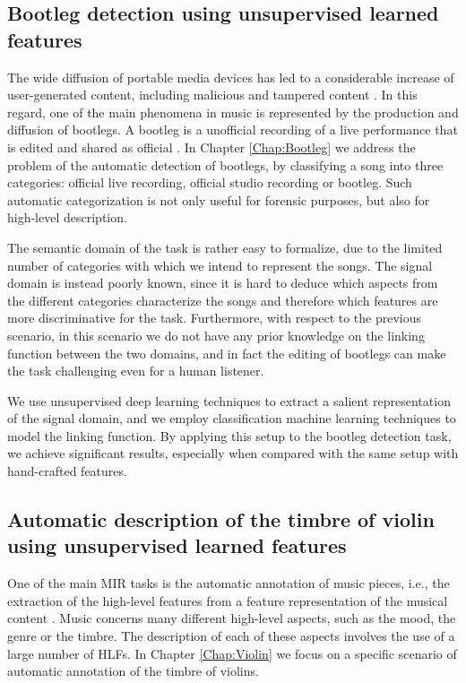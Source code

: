 \subsection{Bootleg detection using unsupervised learned features}
The wide diffusion of portable media devices has led to a considerable increase of user-generated content, including malicious and tampered content \cite{Melloni2015}. In this regard, one of the main phenomena in music is represented by the production and diffusion of bootlegs. A bootleg is a unofficial recording of a live performance that is edited and shared as official \cite{Bestagini2013b}. In Chapter \ref{Chap:Bootleg} we address the problem of the automatic detection of bootlegs, by classifying a song into three categories: official live recording, official studio recording or bootleg. Such automatic categorization is not only useful for forensic purposes, but also for high-level description.

The semantic domain of the task is rather easy to formalize, due to the limited number of categories with which we intend to represent the songs. The signal domain is instead poorly known, since it is hard to deduce which aspects from the different categories characterize the songs and therefore which features are more discriminative for the task. Furthermore, with respect to the previous scenario, in this scenario we do not have any prior knowledge on the linking function between the two domains, and in fact the editing of bootlegs can make the task challenging even for a human listener.

We use unsupervised deep learning techniques to extract a salient representation of the signal domain, and we employ classification machine learning techniques to model the linking function. By applying this setup to the bootleg detection task, we achieve significant results, especially when compared with the same setup with hand-crafted features.


\subsection{Automatic description of the timbre of violin using unsupervised learned features}
One of the main MIR tasks is the automatic annotation of music pieces, i.e., the extraction of the high-level features from a feature representation of the musical content \cite{brossier2006}. Music concerns many different high-level aspects, such as the mood, the genre or the timbre. The description of each of these aspects involves the use of a large number of HLFs. In Chapter \ref{Chap:Violin} we focus on a specific scenario of automatic annotation of the timbre of violins.  %

